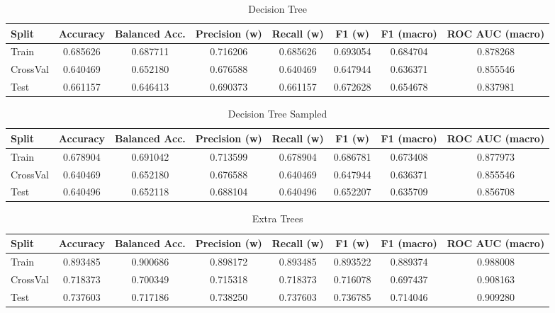 \begin{table}[H]
	\centering
	\caption{Decision Tree}
	\begin{adjustbox}{max width=\textwidth}
		\begin{tabular}{lccccccc}
			\toprule
			Split & Accuracy & Balanced Acc. & Precision (w) & Recall (w) & F1 (w) & F1 (macro) & ROC AUC (macro) \\
			\midrule
			Train & 0.685626 & 0.687711 & 0.716206 & 0.685626 & 0.693054 & 0.684704 & 0.878268 \\
			CrossVal & 0.640469 & 0.652180 & 0.676588 & 0.640469 & 0.647944 & 0.636371 & 0.855546 \\
			Test & 0.661157 & 0.646413 & 0.690373 & 0.661157 & 0.672628 & 0.654678 & 0.837981 \\
			\bottomrule
		\end{tabular}
	\end{adjustbox}
\end{table}

\begin{table}[H]
	\centering
	\caption{Decision Tree Sampled}
	\begin{adjustbox}{max width=\textwidth}
		\begin{tabular}{lccccccc}
			\toprule
			Split & Accuracy & Balanced Acc. & Precision (w) & Recall (w) & F1 (w) & F1 (macro) & ROC AUC (macro) \\
			\midrule
			Train & 0.678904 & 0.691042 & 0.713599 & 0.678904 & 0.686781 & 0.673408 & 0.877973 \\
			CrossVal & 0.640469 & 0.652180 & 0.676588 & 0.640469 & 0.647944 & 0.636371 & 0.855546 \\
			Test & 0.640496 & 0.652118 & 0.688104 & 0.640496 & 0.652207 & 0.635709 & 0.856708 \\
			\bottomrule
		\end{tabular}
	\end{adjustbox}
\end{table}

\begin{table}[H]
	\centering
	\caption{Extra Trees}
	\begin{adjustbox}{max width=\textwidth}
		\begin{tabular}{lccccccc}
			\toprule
			Split & Accuracy & Balanced Acc. & Precision (w) & Recall (w) & F1 (w) & F1 (macro) & ROC AUC (macro) \\
			\midrule
			Train & 0.893485 & 0.900686 & 0.898172 & 0.893485 & 0.893522 & 0.889374 & 0.988008 \\
			CrossVal & 0.718373 & 0.700349 & 0.715318 & 0.718373 & 0.716078 & 0.697437 & 0.908163 \\
			Test & 0.737603 & 0.717186 & 0.738250 & 0.737603 & 0.736785 & 0.714046 & 0.909280 \\
			\bottomrule
		\end{tabular}
	\end{adjustbox}
\end{table}

